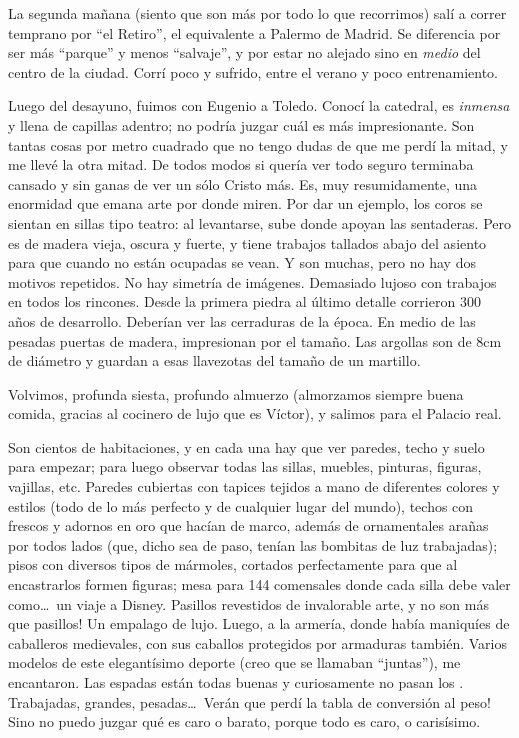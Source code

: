 La segunda ma\~nana (siento que son m\'as por todo lo que recorrimos) sal\'i a
correr temprano por ``el Retiro'', el equivalente a Palermo de Madrid. Se
diferencia por ser m\'as ``parque'' y menos ``salvaje'', y por estar no
alejado sino en \emph{medio} del centro de la ciudad. Corr\'i poco y
sufrido, entre el verano y poco entrenamiento. %

Luego del desayuno, fuimos con Eugenio a Toledo. Conoc\'i la catedral, es
\emph{inmensa} y llena de capillas adentro; no podr\'ia juzgar cu\'al es m\'as
impresionante. Son tantas cosas por metro cuadrado que no tengo dudas de que me
perd\'i la mitad, y me llev\'e la otra mitad. De todos modos si quer\'ia ver
todo seguro terminaba cansado y sin ganas de ver un s\'olo Cristo m\'as. Es, muy
resumidamente, una enormidad que emana arte por donde miren. Por dar un ejemplo,
los coros se sientan en sillas tipo teatro: al levantarse, sube donde apoyan las
sentaderas. Pero es de madera vieja, oscura y fuerte, y tiene trabajos tallados
abajo del asiento para que cuando no est\'an ocupadas se vean. Y son muchas,
pero no hay dos motivos repetidos. No hay simetr\'ia de im\'agenes. Demasiado
lujoso con trabajos en todos los rincones. Desde la primera piedra al \'ultimo
detalle corrieron 300 a\~nos de desarrollo. Deber\'ian ver las cerraduras de la
\'epoca. En medio de las pesadas puertas de madera, impresionan por el tama\~no.
Las argollas son de 8cm de di\'ametro y guardan a esas llavezotas del tama\~no
de un martillo.

Volvimos, profunda siesta, profundo almuerzo (almorzamos siempre buena comida,
gracias al cocinero de lujo que es V\'ictor), y salimos para el Palacio real.

Son cientos de habitaciones, y en cada una hay que ver paredes, techo y suelo
para empezar; para luego observar todas las sillas, muebles, pinturas, figuras,
vajillas, etc. Paredes cubiertas con tapices tejidos a mano de diferentes
colores y estilos (todo de lo m\'as perfecto y de cualquier lugar del mundo),
techos con frescos y adornos en oro que hac\'ian de marco, adem\'as de
ornamentales ara\~nas por todos lados (que, dicho sea de paso, ten\'ian las
bombitas de luz trabajadas); pisos con diversos tipos de m\'armoles, cortados
perfectamente para que al encastrarlos formen figuras; mesa para 144 comensales
donde cada silla debe valer como\ldots\ un viaje a Disney. \textexclamdown
Pasillos revestidos de invalorable arte, y no son m\'as que pasillos! Un
empalago de lujo. Luego, a la armer\'ia, donde hab\'ia maniqu\'ies de caballeros
medievales, con sus caballos protegidos por armaduras tambi\'en. Varios modelos
de este elegant\'isimo deporte (creo que se llamaban ``juntas''), me
encantaron. Las espadas est\'an todas buenas y curiosamente no pasan los
. Trabajadas, grandes, pesadas\ldots\ \textexclamdown Ver\'an
que perd\'i la tabla de conversi\'on al peso! Sino no puedo juzgar qu\'e es caro
o barato, porque todo es caro, o caris\'isimo.

